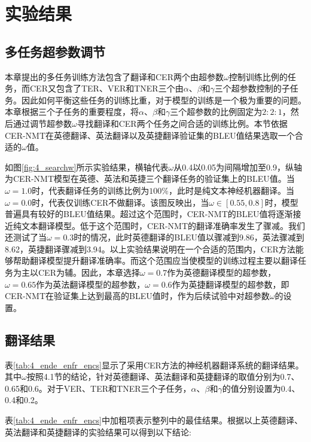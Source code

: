 \section{实验结果}

\subsection{多任务超参数调节}
\label{sec:4_omega}
本章提出的多任务训练方法包含了翻译和CER两个由超参数$\omega$控制训练比例的任务，而CER又包含了TER、VER和TNER三个由$\alpha$、$\beta$和$\gamma$三个超参数控制的子任务。因此如何平衡这些任务的训练比重，对于模型的训练是一个极为重要的问题。本章根据三个子任务的重要程度，将$\alpha$、$\beta$和$\gamma$三个超参数的比例固定为$2:2:1$，然后通过调节超参数$\omega$寻找翻译和CER两个任务之间合适的训练比例。本节依据CER-NMT在英德翻译、英法翻译以及英捷翻译验证集的BLEU值结果选取一个合适的$\omega$值。


如图\ref{fig:4_searchw}所示实验结果，横轴代表$\omega$从0.4以0.05为间隔增加至0.9，纵轴为CER-NMT模型在英德、英法和英捷三个翻译任务的验证集上的BLEU值。当$\omega=1.0$时，代表翻译任务的训练比例为$100\%$，此时是纯文本神经机器翻译。当$\omega=0.0$时，代表仅训练CER不做翻译。该图反映出，当$\omega \in [0.55,0.8]$时，模型普遍具有较好的BLEU值结果。超过这个范围时，CER-NMT的BLEU值将逐渐接近纯文本翻译模型。低于这个范围时，CER-NMT的翻译准确率发生了骤减。我们还测试了当$\omega=0.3$时的情况，此时英德翻译的BLEU值以骤减到9.86，英法骤减到8.62，英捷翻译骤减到3.94。以上实验结果说明在一个合适的范围内，CER方法能够帮助翻译模型提升翻译准确率。而这个范围应当使模型的训练过程主要以翻译任务为主以CER为辅。因此，本章选择$\omega=0.7$作为英德翻译模型的超参数，$\omega=0.65$作为英法翻译模型的超参数，$\omega=0.6$作为英捷翻译模型的超参数，即CER-NMT在验证集上达到最高的BLEU值时，作为后续试验中对超参数$\omega$的设置。


\subsection{翻译结果}
\label{sec:4_translation_results}



表\ref{tab:4_ende_enfr_encs}显示了采用CER方法的神经机器翻译系统的翻译结果。其中$\omega$按照4.1节的结论，针对英德翻译、英法翻译和英捷翻译的取值分别为0.7、0.65和0.6。对于VER、TER和TNER三个子任务，$\alpha$、$\beta$和$\gamma$的值分别设置为0.4、0.4和0.2。


表\ref{tab:4_ende_enfr_encs}中加粗项表示整列中的最佳结果。根据以上英德翻译、英法翻译和英捷翻译的实验结果可以得到以下结论:

